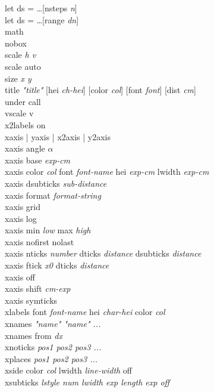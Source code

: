 {\sf let ds = \ldots [nsteps {\it n}]} \\
{\sf let ds = \ldots [range {\it dn}]} \\
{\sf math } \\
{\sf nobox } \\
{\sf scale {\it h v}} \\
{\sf scale auto} \\
{\sf size {\it x y }}\\
{\sf title {\it "title"}  [hei {\it ch-hei}] [color {\it col}] [font {\it font}] [dist {\it cm}]  }   \\
{\sf under call} \\
{\sf vscale v} \\
{\sf x2labels on} \\
{\sf xaxis | yaxis | x2axis | y2axis}\\
{\sf xaxis angle $\alpha$} \\
{\sf xaxis base {\it exp-cm}}  \\
{\sf xaxis color {\it col} font {\it font-name}  hei {\it exp-cm} lwidth {\it exp-cm}} \\
{\sf xaxis dsubticks {\it sub-distance} }  \\
{\sf xaxis format {\it format-string} } \\
{\sf xaxis grid }  \\
{\sf xaxis log}  \\
{\sf xaxis min {\it low} max {\it high}}  \\
{\sf xaxis nofirst nolast}  \\
{\sf xaxis nticks {\it number} dticks {\it distance} dsubticks {\it distance}} \\
{\sf xaxis ftick {\it x0} dticks {\it distance}} \\
{\sf xaxis off}  \\
{\sf xaxis shift {\it cm-exp}}  \\
{\sf xaxis symticks} \\
{\sf xlabels font {\it font-name} hei {\it char-hei} color {\it col} }\\
{\sf xnames {\it "name"  "name" ...}}  \\
{\sf xnames from {\it dx}}  \\
{\sf xnoticks {\it pos1 pos2 pos3 ...}}  \\
{\sf xplaces {\it pos1 pos2 pos3 ...}}  \\
{\sf xside color {\it col} lwidth {\it line-width} off  } \\
{\sf xsubticks {\it {\sf lstyle} num  {\sf lwidth} exp {\sf length} exp  {\sf off}}} \\
